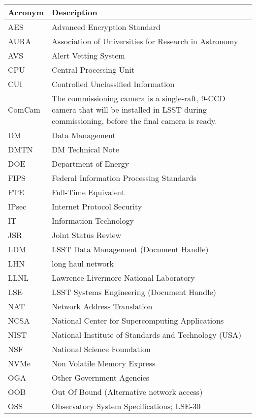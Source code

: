\addtocounter{table}{-1}
\begin{longtable}{p{}p{}}\hline
\textbf{Acronym} & \textbf{Description}  \\\hline

AES & Advanced Encryption Standard \\\hline
AURA & Association of Universities for Research in Astronomy \\\hline
AVS &  Alert Vetting System \\\hline
CPU & Central Processing Unit \\\hline
CUI & Controlled Unclassified Information \\\hline
ComCam & The commissioning camera is a single-raft, 9-CCD camera that will be installed in LSST during commissioning, before the final camera is ready. \\\hline
DM & Data Management \\\hline
DMTN & DM Technical Note \\\hline
DOE & Department of Energy \\\hline
FIPS & Federal Information Processing Standards \\\hline
FTE & Full-Time Equivalent \\\hline
IPsec & Internet Protocol Security \\\hline
IT & Information Technology \\\hline
JSR & Joint Status Review \\\hline
LDM & LSST Data Management (Document Handle) \\\hline
LHN & long haul network \\\hline
LLNL & Lawrence Livermore National Laboratory \\\hline
LSE & LSST Systems Engineering (Document Handle) \\\hline
NAT & Network Address Translation \\\hline
NCSA & National Center for Supercomputing Applications \\\hline
NIST & National Institute of Standards and Technology (USA) \\\hline
NSF & National Science Foundation \\\hline
NVMe & Non Volatile Memory Express \\\hline
OGA & Other Government Agencies \\\hline
OOB & Out Of Bound (Alternative network access) \\\hline
OSS & Observatory System Specifications; LSE-30 \\\hline

\end{longtable}
